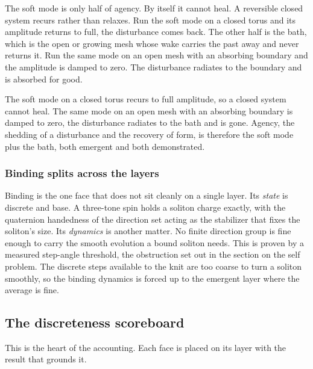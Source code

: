 The soft mode is only half of agency. By itself it cannot heal. A reversible closed system recurs rather than relaxes. Run the soft mode on a closed torus and its amplitude returns to full, the disturbance comes back. The other half is the bath, which is the open or growing mesh whose wake carries the past away and never returns it. Run the same mode on an open mesh with an absorbing boundary and the amplitude is damped to zero. The disturbance radiates to the boundary and is absorbed for good.

\begin{result}
The soft mode on a closed torus recurs to full amplitude, so a closed system cannot heal. The same mode on an open mesh with an absorbing boundary is damped to zero, the disturbance radiates to the bath and is gone. Agency, the shedding of a disturbance and the recovery of form, is therefore the soft mode plus the bath, both emergent and both demonstrated.
\end{result}

\subsubsection{Binding splits across the layers}

Binding is the one face that does not sit cleanly on a single layer. Its \emph{state} is discrete and base. A three-tone spin holds a soliton charge exactly, with the quaternion handedness of the direction set acting as the stabilizer that fixes the soliton's size. Its \emph{dynamics} is another matter. No finite direction group is fine enough to carry the smooth evolution a bound soliton needs. This is proven by a measured step-angle threshold, the obstruction set out in the section on the self problem. The discrete steps available to the knit are too coarse to turn a soliton smoothly, so the binding dynamics is forced up to the emergent layer where the average is fine.

\subsection{The discreteness scoreboard}

This is the heart of the accounting. Each face is placed on its layer with the result that grounds it.

